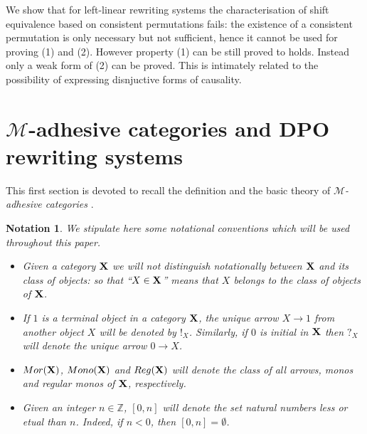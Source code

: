 \documentclass[a4paper,UKenglish,cleveref,pdftex, thm-restate,numberwithinsect]{lipics}
\newcommand{\mor}{\mathsf{Mor}}
\newcommand{\mon}{\mathsf{Mono}}
\newcommand{\reg}{\mathsf{Reg}}
\def\X{\textbf {\textup{X}}}
\def\Set{\textbf {\textup{Set}}}
\newtheorem*{notation}{Notation}
\begin{document}
We show that for left-linear rewriting systems the characterisation of
shift equivalence based on consistent permutations fails: the
existence of a consistent permutation is only necessary but not
sufficient, hence it cannot be used for proving (1) and (2). However property (1) can be still proved to holds. Instead only a weak form of (2) can be proved. This is intimately related to the possibility of expressing disnjuctive forms of causality.




\section{$\mathcal{M}$-adhesive categories and DPO rewriting systems}\label{sec:ade}

This first section is devoted to recall the definition and the basic theory of \emph{$\mathcal{M}$-adhesive categories} \cite{azzi2019essence,ehrig2012,ehrig2014adhesive,lack2005adhesive}. 

\begin{notation} 
We stipulate here some notational conventions which will be used throughout this paper. 
\begin{itemize}\item 
	Given a category $\X$ we will not distinguish notationally between $\X$ and its class of objects: so that ``$X\in \X$'' means that $X$ belongs to the class of objects of $\X$.  
	\item 
	If $1$ is a terminal object in a category $\X$,  the unique arrow $X\to 1$ from another object $X$ will be denoted by $!_X$. Similarly, if $0$ is initial in $\X$ then $?_X$ will denote the unique arrow $0\to X$. %
	\item  $\mor(\X)$, $\mon(\X)$ and $\reg(\X)$ will denote the class of all arrows, monos and regular monos of $\X$, respectively.
	
	\item Given an integer $n\in \mathbb{Z}$, $[0,n]$ will denote the set natural numbers less or etual than $n$.
	Indeed, if $n<0$, then $[0,n]=\emptyset$.
\end{itemize}
\end{notation}
\end{document}

